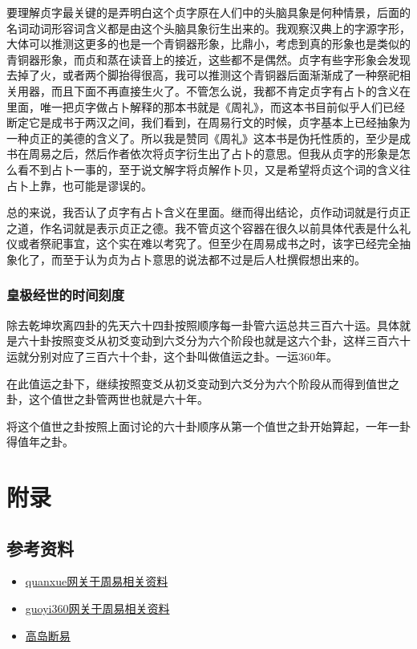 \documentclass[12pt,oneside]{book}
\begin{document}
要理解贞字最关键的是弄明白这个贞字原在人们中的头脑具象是何种情景，后面的名词动词形容词含义都是由这个头脑具象衍生出来的。我观察汉典上的字源字形，大体可以推测这更多的也是一个青铜器形象，比鼎小，考虑到真的形象也是类似的青铜器形象，而贞和蒸在读音上的接近，这些都不是偶然。贞字有些字形象会发现去掉了火，或者两个脚抬得很高，我可以推测这个青铜器后面渐渐成了一种祭祀相关用器，而且下面不再直接生火了。不管怎么说，我都不肯定贞字有占卜的含义在里面，唯一把贞字做占卜解释的那本书就是《周礼》，而这本书目前似乎人们已经断定它是成书于两汉之间，我们看到，在周易行文的时候，贞字基本上已经抽象为一种贞正的美德的含义了。所以我是赞同《周礼》这本书是伪托性质的，至少是成书在周易之后，然后作者依次将贞字衍生出了占卜的意思。但我从贞字的形象是怎么看不到占卜一事的，至于说文解字将贞解作卜贝，又是希望将贞这个词的含义往占卜上靠，也可能是谬误的。

总的来说，我否认了贞字有占卜含义在里面。继而得出结论，贞作动词就是行贞正之道，作名词就是表示贞正之德。我不管贞这个容器在很久以前具体代表是什么礼仪或者祭祀事宜，这个实在难以考究了。但至少在周易成书之时，该字已经完全抽象化了，而至于认为贞为占卜意思的说法都不过是后人杜撰假想出来的。




\section{皇极经世的时间刻度}
除去乾坤坎离四卦的先天六十四卦按照顺序每一卦管六运总共三百六十运。具体就是六十卦按照变爻从初爻变动到六爻分为六个阶段也就是这六个卦，这样三百六十运就分别对应了三百六十个卦，这个卦叫做值运之卦。一运360年。

在此值运之卦下，继续按照变爻从初爻变动到六爻分为六个阶段从而得到值世之卦，这个值世之卦管两世也就是六十年。

将这个值世之卦按照上面讨论的六十卦顺序从第一个值世之卦开始算起，一年一卦得值年之卦。



\part{附录}
\chapter{参考资料}
\begin{itemize}
\item \href{http://www.quanxue.cn/QT_MingXiang/Index.html}{quanxue网关于周易相关资料}
\item \href{http://www.guoyi360.com/zyqs/}{guoyi360网关于周易相关资料}
\item \href{http://www.xshiqi.com/category_zyzs/dgzs/gddy}{高岛断易}
\end{itemize}








\end{document}
